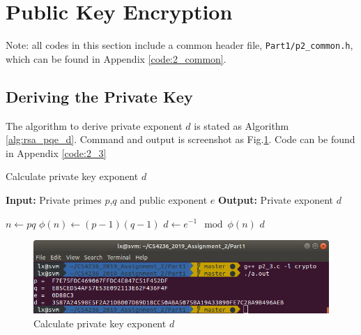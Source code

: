 \section{Public Key Encryption}

Note: all codes in this section include a common header file, \texttt{Part1/p2\_common.h}, which can be found in Appendix \ref{code:2_common}.

\setcounter{subsection}{2}
\subsection{Deriving the Private Key}

The algorithm to derive private exponent $d$ is stated as Algorithm \ref{alg:rsa_pqe_d}.
Command and output is screenshot as Fig.\ref{fig:p2_3}.
Code can be found in Appendix \ref{code:2_3}

\begin{algorithm}
\caption{Calculate private key exponent $d$}
\label{alg:rsa_pqe_d}
\begin{algorithmic}
\STATE \textbf{Input:} Private primes $p$,$q$ and public exponent $e$
\STATE \textbf{Output:} Private exponent $d$

\STATE $ n \gets pq $
\STATE $ \phi(n) \gets (p-1)(q-1) $
\STATE $ d \gets e^{-1} \mod{\phi(n)} $
\RETURN $ d $
\end{algorithmic}
\end{algorithm}

\begin{figure}[t!]
\centering
\includegraphics[width=\columnwidth]{resources/p2_3.png}
\caption{
    Calculate private key exponent $d$
}
\label{fig:p2_3}
\end{figure}

